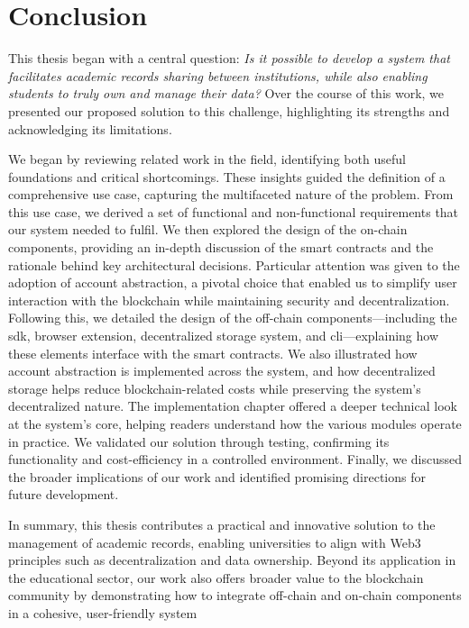 \chapter{Conclusion}
\label{chap:conclusion}
This thesis began with a central question: \textit{Is it possible to develop a system that facilitates academic records sharing between institutions, while also enabling students to truly own and manage their data?} Over the course of this work, we presented our proposed solution to this challenge, highlighting its strengths and acknowledging its limitations.

We began by reviewing related work in the field, identifying both useful foundations and critical shortcomings. These insights guided the definition of a comprehensive use case, capturing the multifaceted nature of the problem. From this use case, we derived a set of functional and non-functional requirements that our system needed to fulfil.
We then explored the design of the on-chain components, providing an in-depth discussion of the smart contracts and the rationale behind key architectural decisions. Particular attention was given to the adoption of account abstraction, a pivotal choice that enabled us to simplify user interaction with the blockchain while maintaining security and decentralization.
Following this, we detailed the design of the off-chain components—including the \gls{sdk}, browser extension, decentralized storage system, and \gls{cli}—explaining how these elements interface with the smart contracts. We also illustrated how account abstraction is implemented across the system, and how decentralized storage helps reduce blockchain-related costs while preserving the system’s decentralized nature.
The implementation chapter offered a deeper technical look at the system's core, helping readers understand how the various modules operate in practice. We validated our solution through testing, confirming its functionality and cost-efficiency in a controlled environment. Finally, we discussed the broader implications of our work and identified promising directions for future development.

In summary, this thesis contributes a practical and innovative solution to the management of academic records, enabling universities to align with Web3 principles such as decentralization and data ownership. Beyond its application in the educational sector, our work also offers broader value to the blockchain community by demonstrating how to integrate off-chain and on-chain components in a cohesive, user-friendly system